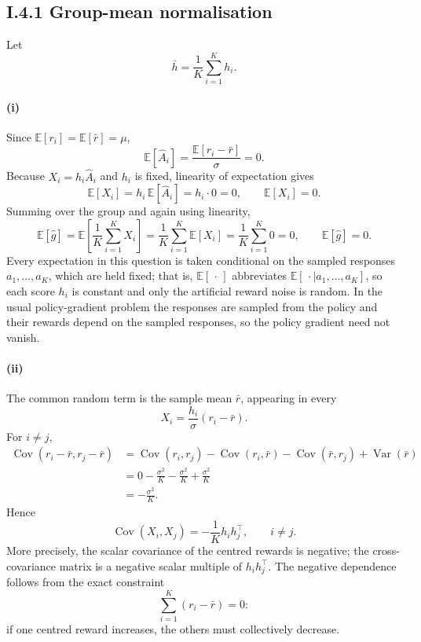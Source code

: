 \subsection*{I.4.1 Group-mean normalisation}

Let
\[
\bar h=\frac{1}{K}\sum_{i=1}^K h_i.
\]

\paragraph{(i)}
Since $\mathbb{E}[r_i]=\mathbb{E}[\bar r]=\mu$,
\[
\mathbb{E}[\hat A_i]
=
\frac{\mathbb{E}[r_i-\bar r]}{\sigma}
=0.
\]
Because $X_i=h_i\hat A_i$ and $h_i$ is fixed, linearity of expectation gives
\[
\mathbb{E}[X_i]
=
h_i\,\mathbb{E}[\hat A_i]
=
h_i\cdot 0
=0,
\qquad
\boxed{\mathbb{E}[X_i]=0}.
\]
Summing over the group and again using linearity,
\[
\mathbb{E}[\hat g]
=
\mathbb{E}\!\left[\frac{1}{K}\sum_{i=1}^K X_i\right]
=
\frac{1}{K}\sum_{i=1}^K\mathbb{E}[X_i]
=
\frac{1}{K}\sum_{i=1}^K 0
=0,
\qquad
\boxed{\mathbb{E}[\hat g]=0}.
\]
Every expectation in this question is taken conditional on the sampled
responses $a_1,\dots,a_K$, which are held fixed; that is, $\mathbb{E}[\,\cdot\,]$
abbreviates $\mathbb{E}[\,\cdot\mid a_1,\dots,a_K]$, so each score $h_i$ is
constant and only the artificial reward noise is random. In the usual
policy-gradient problem the responses are sampled from the policy and their
rewards depend on the sampled responses, so the policy gradient need not vanish.

\paragraph{(ii)}
The common random term is the sample mean $\bar r$, appearing in every
\[
X_i=\frac{h_i}{\sigma}(r_i-\bar r).
\]
For $i\neq j$,
\begin{align*}
\operatorname{Cov}(r_i-\bar r,r_j-\bar r)
&=
\operatorname{Cov}(r_i,r_j)
-\operatorname{Cov}(r_i,\bar r)
-\operatorname{Cov}(\bar r,r_j)
+\operatorname{Var}(\bar r)\\
&=
0-\frac{\sigma^2}{K}-\frac{\sigma^2}{K}
+\frac{\sigma^2}{K}\\
&=
-\frac{\sigma^2}{K}.
\end{align*}
Hence
\[
\boxed{
\operatorname{Cov}(X_i,X_j)
=
-\frac{1}{K}h_i h_j^\top,
\qquad i\neq j.
}
\]
More precisely, the scalar covariance of the centred rewards is negative; the
cross-covariance matrix is a negative scalar multiple of $h_i h_j^\top$.
The negative dependence follows from the exact constraint
\[
\sum_{i=1}^K(r_i-\bar r)=0:
\]
if one centred reward increases, the others must collectively decrease.

